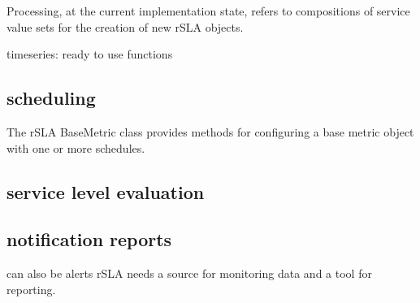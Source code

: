 Processing, at the current implementation state, refers to compositions of service value sets for the creation of new rSLA objects.

timeseries: ready to use functions
\subsection{scheduling}\label{schedule}
The rSLA BaseMetric class provides methods for configuring a base metric object with one or more schedules.
\subsection{service level evaluation}

\subsection{notification reports}
can also be alerts
rSLA needs a source for monitoring data and a tool for reporting.